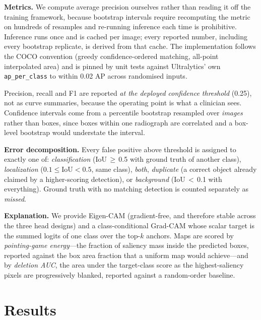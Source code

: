 \documentclass[10pt,twocolumn]{article}
\begin{document}
\textbf{Metrics.} We compute average precision ourselves rather than reading it
off the training framework, because bootstrap intervals require recomputing the
metric on hundreds of resamples and re-running inference each time is
prohibitive. Inference runs once and is cached per image; every reported number,
including every bootstrap replicate, is derived from that cache. The
implementation follows the COCO convention (greedy confidence-ordered matching,
all-point interpolated area) and is pinned by unit tests against Ultralytics'
own \texttt{ap\_per\_class} to within 0.02 AP across randomised inputs.

Precision, recall and F1 are reported \emph{at the deployed confidence
threshold} (0.25), not as curve summaries, because the operating point is what a
clinician sees. Confidence intervals come from a percentile bootstrap resampled
over \emph{images} rather than boxes, since boxes within one radiograph are
correlated and a box-level bootstrap would understate the interval.

\textbf{Error decomposition.} Every false positive above threshold is assigned
to exactly one of: \emph{classification} (IoU$\,\geq\,$0.5 with ground truth of
another class), \emph{localization} ($0.1\leq$IoU$<0.5$, same class),
\emph{both}, \emph{duplicate} (a correct object already claimed by a
higher-scoring detection), or \emph{background} (IoU$\,<\,$0.1 with everything).
Ground truth with no matching detection is counted separately as \emph{missed}.

\textbf{Explanation.} We provide Eigen-CAM (gradient-free, and therefore stable
across the three head designs) and a class-conditional Grad-CAM whose scalar
target is the summed logits of one class over the top-$k$ anchors. Maps are
scored by \emph{pointing-game energy}---the fraction of saliency mass inside the
predicted boxes, reported against the box area fraction that a uniform map would
achieve---and by \emph{deletion AUC}, the area under the target-class score as
the highest-saliency pixels are progressively blanked, reported against a
random-order baseline.

\section{Results}
\end{document}
